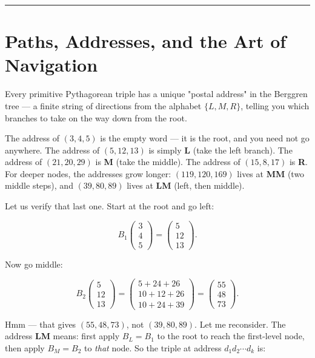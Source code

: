 \documentclass[11pt,openany]{book}
\theoremstyle{definition}
\theoremstyle{plain}
\theoremstyle{remark}
\begin{document}
\bigskip\noindent\rule{\textwidth}{0.4pt}\bigskip


\section*{Paths, Addresses, and the Art of Navigation}


Every primitive Pythagorean triple has a unique "postal address" in the Berggren tree — a finite string of directions from the alphabet $\{L, M, R\}$, telling you which branches to take on the way down from the root.

The address of $(3, 4, 5)$ is the empty word — it is the root, and you need not go anywhere. The address of $(5, 12, 13)$ is simply \textbf{L} (take the left branch). The address of $(21, 20, 29)$ is \textbf{M} (take the middle). The address of $(15, 8, 17)$ is \textbf{R}. For deeper nodes, the addresses grow longer: $(119, 120, 169)$ lives at \textbf{MM} (two middle steps), and $(39, 80, 89)$ lives at \textbf{LM} (left, then middle).

Let us verify that last one. Start at the root and go left:

$$B_1 \begin{pmatrix} 3 \\ 4 \\ 5 \end{pmatrix} = \begin{pmatrix} 5 \\ 12 \\ 13 \end{pmatrix}.$$

Now go middle:

$$B_2 \begin{pmatrix} 5 \\ 12 \\ 13 \end{pmatrix} = \begin{pmatrix} 5 + 24 + 26 \\ 10 + 12 + 26 \\ 10 + 24 + 39 \end{pmatrix} = \begin{pmatrix} 55 \\ 48 \\ 73 \end{pmatrix}.$$

Hmm — that gives $(55, 48, 73)$, not $(39, 80, 89)$. Let me reconsider. The address \textbf{LM} means: first apply $B_L = B_1$ to the root to reach the first-level node, then apply $B_M = B_2$ to \textit{that} node. So the triple at address $d_1 d_2 \cdots d_k$ is:
\end{document}
